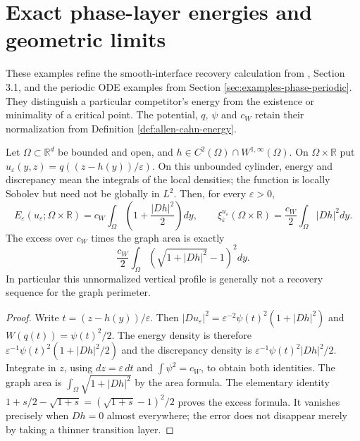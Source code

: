 \chapter{Exact phase-layer energies and geometric limits}\label{sec:examples-phase-geometry}
These examples refine the smooth-interface recovery calculation from \cite{ChAC}, Section 3.1, and the periodic ODE examples from Section \ref{sec:examples-phase-periodic}. They distinguish a particular competitor's energy from the existence or minimality of a critical point. The potential, $q$, $\psi$ and $c_W$ retain their normalization from Definition \ref{def:allen-cahn-energy}.

\begin{example}\label{ex:phase-vertical-graph-energy}
Let $\Omega\subset\mathbb R^d$ be bounded and open, and $h\in C^2(\Omega)\cap W^{1,\infty}(\Omega)$. On $\Omega\times\mathbb R$ put
$u_\varepsilon(y,z)=q((z-h(y))/\varepsilon)$. On this unbounded cylinder, energy and discrepancy mean the integrals of the local densities; the function is locally Sobolev but need not be globally in $L^2$. Then, for every $\varepsilon>0$,
\[
 E_\varepsilon(u_\varepsilon;\Omega\times\mathbb R)
  =c_W\int_\Omega\left(1+\frac{|Dh|^2}{2}\right)dy,
 \qquad
 \xi_\varepsilon^{u_\varepsilon}(\Omega\times\mathbb R)
  =\frac{c_W}{2}\int_\Omega|Dh|^2dy.
\]
The excess over $c_W$ times the graph area is exactly
\[
 \frac{c_W}{2}\int_\Omega
       \left(\sqrt{1+|Dh|^2}-1\right)^2dy.
\]
In particular this unnormalized vertical profile is generally not a recovery sequence for the graph perimeter.
\end{example}
\begin{proof}
Write $t=(z-h(y))/\varepsilon$. Then
$|Du_\varepsilon|^2=\varepsilon^{-2}\psi(t)^2(1+|Dh|^2)$ and $W(q(t))=\psi(t)^2/2$. The energy density is therefore
$\varepsilon^{-1}\psi(t)^2(1+|Dh|^2/2)$ and the discrepancy density is
$\varepsilon^{-1}\psi(t)^2|Dh|^2/2$. Integrate in $z$, using $dz=\varepsilon\,dt$ and $\int\psi^2=c_W$, to obtain both identities. The graph area is $\int_\Omega\sqrt{1+|Dh|^2}$ by the area formula. The elementary identity
$1+s/2-\sqrt{1+s}=(\sqrt{1+s}-1)^2/2$ proves the excess formula. It vanishes precisely when $Dh=0$ almost everywhere; the error does not disappear merely by taking a thinner transition layer.
\end{proof}

